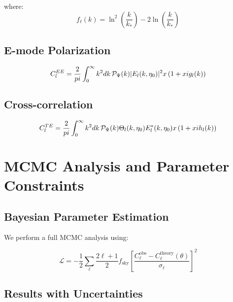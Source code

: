 \documentclass[12pt,a4paper]{report}
\begin{document}
	where:
	\begin{equation}
		f_\ell(k) = \ln^2\left(\frac{k}{k_*}\right) - 2\ln\left(\frac{k}{k_*}\right)
	\end{equation}
	
	\subsection{E-mode Polarization}
	
	\begin{equation}
		C_l^{EE} = \frac{2}{pi}\int_0^\infty k^2 dk \, \mathcal{P}_\Psi(k) |E_l(k,\eta_0)|^2 x \left(1 + xi g_l(k)\right)
	\end{equation}
	
	\subsection{Cross-correlation}
	
	\begin{equation}
		C_l^{TE} = \frac{2}{pi}\int_0^\infty k^2 dk \, \mathcal{P}_\Psi(k) \Theta_l(k,\eta_0) E_l^*(k,\eta_0) x \left(1 + xi h_l(k)\right)
	\end{equation}
	
	\section{MCMC Analysis and Parameter Constraints}
	\label{sec:mcmc}
	
	\subsection{Bayesian Parameter Estimation}
	
	We perform a full MCMC analysis using:
	
	\begin{equation}
		\mathcal{L} = -\frac{1}{2}\sum_{\ell} \frac{2\ell+1}{2} f_{\text{sky}} \left[\frac{C_\ell^{\text{obs}} - C_\ell^{\text{theory}}(\theta)}{\sigma_\ell}\right]^2
	\end{equation}
	
	\subsection{Results with Uncertainties}
	
\end{document}

